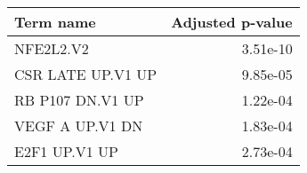 \begin{tabular}{lr}
\toprule
         Term name &  Adjusted p-value \\
\midrule
         NFE2L2.V2 &          3.51e-10 \\
 CSR LATE UP.V1 UP &          9.85e-05 \\
  RB P107 DN.V1 UP &          1.22e-04 \\
   VEGF A UP.V1 DN &          1.83e-04 \\
     E2F1 UP.V1 UP &          2.73e-04 \\
\bottomrule
\end{tabular}
